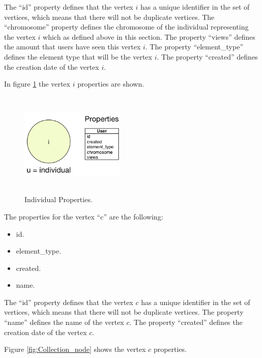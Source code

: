 The “id” property defines that the vertex $i$ has a unique identifier in the set
of vertices, which means that there will not be duplicate vertices. The
“chromosome” property defines the chromosome of the individual representing the
vertex $i$ which as defined above in this section. The property “views” defines
the amount that users have seen this vertex $i$. The property “element\_type”
defines the element type that will be the vertex $i$. The property “created”
defines the creation date of the vertex $i$.



In figure \ref{fig:Individual_node} the vertex $i$ properties are shown.

\begin{figure}
\captionsetup{justification=centering,margin=2cm}
\centering
\setlength\fboxsep{0pt}
\setlength\fboxrule{0.7pt}
\includegraphics[width=5cm,height=5cm,keepaspectratio]{img/individual_node.png}
\caption{Individual Properties.}
\label{fig:Individual_node}
\end{figure}

The properties for the vertex “c” are the following:

\begin{itemize}
\item id.
\item element\_type.
\item created.
\item name.
\end{itemize}

The “id” property defines that the vertex $c$ has a unique identifier in the set
of vertices, which means that there will not be duplicate vertices. The
property “name” defines the name of the vertex $c$. The property “created”
defines the creation date of the vertex $c$.

Figure \ref{fig:Collection_node} shows the vertex $c$ properties.

